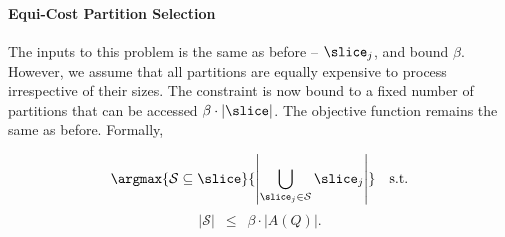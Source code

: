 

\paragraph{Equi-Cost Partition Selection}
\label{sec:pbps}
The inputs to this problem is the same as before -- $\slice_{j}$, and bound ${\beta}$. However, we assume that all partitions are equally expensive to process irrespective of their sizes. The constraint is now bound to a fixed number of partitions that can be accessed $\beta\cdot|\slice|$. The objective function remains the same as before. Formally,



\begin{definition}

\begin{equation*}
  \argmax{\mathcal{S} \subseteq \slice}{\left| \bigcup_{\slice_j \in \mathcal{S}}{\slice_{j}} \right|} \quad \mbox {s.t.}  
\end{equation*}
\begin{equation*}
  |\mathcal{S}| \,\,\,\leq \,\,\,\beta \cdot \left|A(Q) \right|.  
\end{equation*}
\end{definition}


